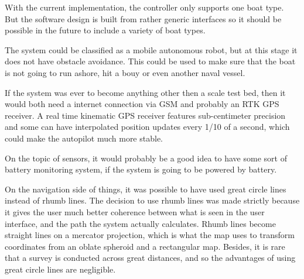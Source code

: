 With the current implementation, the controller only supports one boat type. But the software design is built from rather generic interfaces so it should be possible in the future to include a variety of boat types.

The system could be classified as a mobile autonomous robot, but at this stage it does not have obstacle avoidance. This could be used to make sure that the boat is not going to run ashore, hit a bouy or even another naval vessel. 

If the system was ever to become anything other then a scale test bed, then it would both need a internet connection via GSM and probably an RTK GPS receiver. A real time kinematic GPS receiver features sub-centimeter precision and some can have interpolated position updates every 1/10 of a second, which could make the autopilot much more stable.

On the topic of sensors, it would probably be a good idea to have some sort of battery monitoring system, if the system is going to be powered by battery. 

On the navigation side of things, it was possible to have used great circle lines instead of rhumb lines. The decision to use rhumb lines was made strictly because it gives the user much better coherence between what is seen in the user interface, and the path the system actually calculates. Rhumb lines become straight lines on a mercator projection, which is what the map uses to transform coordinates from an oblate spheroid and a rectangular map. Besides, it is rare that a survey is conducted across great distances, and so the advantages of using great circle lines are negligible.


